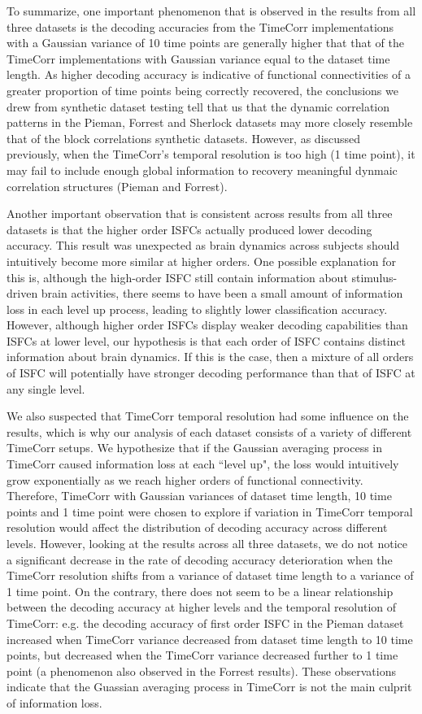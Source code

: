 \documentclass[11pt]{article}
\begin{document}
To summarize, one important phenomenon that is observed in the results from all three datasets is the decoding accuracies from the TimeCorr implementations with a Gaussian variance of 10 time points are generally higher that that of the TimeCorr implementations with Gaussian variance equal to the dataset time length. As higher decoding accuracy is indicative of functional connectivities of a greater proportion of time points being correctly recovered, the conclusions we drew from synthetic dataset testing tell that us that the dynamic correlation patterns in the Pieman, Forrest and Sherlock datasets may more closely resemble that of the block correlations synthetic datasets. However, as discussed previously, when the TimeCorr's temporal resolution is too high (1 time point), it may fail to include enough global information to recovery meaningful dynmaic correlation structures (Pieman and Forrest).

Another important observation that is consistent across results from all three datasets is that the higher order ISFCs actually produced lower decoding accuracy. This result was unexpected as brain dynamics across subjects should intuitively become more similar at higher orders. One possible explanation for this is, although the high-order ISFC still contain information about stimulus-driven brain activities, there seems to have been a small amount of information loss in each level up process, leading to slightly lower classification accuracy. However, although higher order ISFCs display weaker decoding capabilities than ISFCs at lower level, our hypothesis is that each order of ISFC contains distinct information about brain dynamics. If this is the case, then a mixture of all orders of ISFC will potentially have stronger decoding performance than that of ISFC at any single level.

We also suspected that TimeCorr temporal resolution had some influence on the results, which is why our analysis of each dataset consists of a variety of different TimeCorr setups. We hypothesize that if the Gaussian averaging process in TimeCorr caused information loss at each ``level up", the loss would intuitively grow exponentially as we reach higher orders of functional connectivity. Therefore, TimeCorr with Gaussian variances of dataset time length, 10 time points and 1 time point were chosen to explore if variation in TimeCorr temporal resolution would affect the distribution of decoding accuracy across different levels. However, looking at the results across all three datasets, we do not notice a significant decrease in the rate of decoding accuracy deterioration when the TimeCorr resolution shifts from a variance of dataset time length to a variance of 1 time point. On the contrary, there does not seem to be a linear relationship between the decoding accuracy at higher levels and the temporal resolution of TimeCorr: e.g. the decoding accuracy of first order ISFC in the Pieman dataset increased when TimeCorr variance decreased from dataset time length to 10 time points, but decreased when the TimeCorr variance decreased further to 1 time point (a phenomenon also observed in the Forrest results). These observations indicate that the Guassian averaging process in TimeCorr is not the main culprit of information loss.
\end{document}
